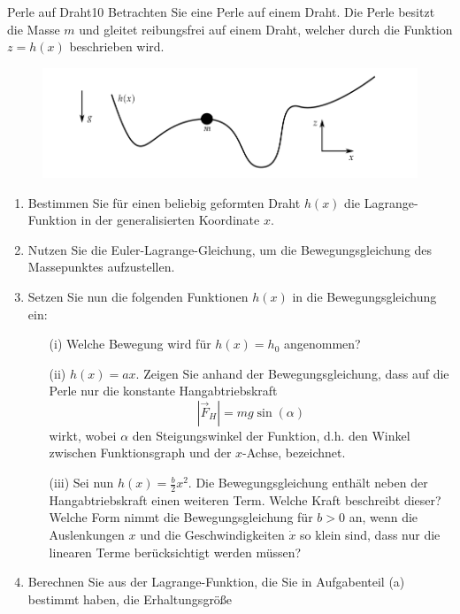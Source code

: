 \begin{exercise}{Perle auf Draht}{10}
  Betrachten Sie eine Perle auf einem Draht. Die Perle besitzt die Masse $m$
  und gleitet reibungsfrei auf einem Draht, welcher durch die Funktion $z = h(x)$
  beschrieben wird.

  \begin{figure}[h]
    \centering
    \includegraphics[width=\textwidth]{Blatt_06_PerleaufDraht.png}
    \label{fig:Höhenprofil}
  \end{figure}

    \begin{enumerate}
        \item Bestimmen Sie für einen beliebig geformten Draht $h(x)$ die Lagrange-Funktion
        in der generalisierten Koordinate $x$.
        \item Nutzen Sie die Euler-Lagrange-Gleichung, um die Bewegungsgleichung
        des Massepunktes aufzustellen.
        \item Setzen Sie nun die folgenden Funktionen $h(x)$ in die Bewegungsgleichung
        ein:
        \begin{itemize}
          \item[(i)] Welche Bewegung wird für $h(x) = h_0$ angenommen?
          \item[(ii)] $h(x) = ax$. Zeigen Sie anhand der Bewegungsgleichung, dass
          auf die Perle nur die konstante Hangabtriebskraft
          \begin{equation}
            \label{eqn:Hangabtrieb}
            \left|\vec{F}_{H}\right| = mg\sin\left(\alpha\right)
          \end{equation}
          wirkt, wobei $\alpha$ den Steigungswinkel der Funktion, d.h. den Winkel
          zwischen Funktionsgraph und der $x$-Achse, bezeichnet.
          \item[(iii)] Sei nun $h(x) = \frac{b}{2}x^2$. Die Bewegungsgleichung enthält
           neben der Hangabtriebskraft einen weiteren Term. Welche Kraft beschreibt
           dieser?\\

           Welche Form nimmt die Bewegungsgleichung für $b > 0$ an, wenn die
           Auslenkungen $x$
           und die Geschwindigkeiten $\dot{x}$ so klein sind, dass nur die linearen Terme
           berücksichtigt werden müssen?\\
         \end{itemize}
           \item Berechnen Sie aus der Lagrange-Funktion, die Sie in Aufgabenteil (a)
           bestimmt haben, die Erhaltungsgrö\ss e


\end{enumerate}
\end{exercise}
